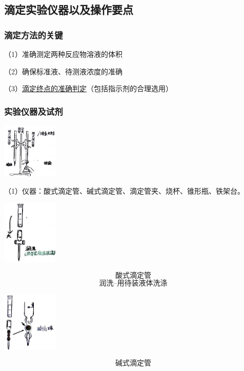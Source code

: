 \documentclass[10pt,cn]{elegantbook}
\begin{document}
	\subsection{滴定实验仪器以及操作要点}
	
	\subsubsection{滴定方法的关键}
	
	（1）准确测定两种反应物溶液的体积
	
	（2）确保标准液、待测液浓度的准确
	
	（3）\uline{滴定终点的准确判定}（包括指示剂的合理选用）
	\subsubsection{实验仪器及试剂}
	
	\begin{center}
		\includegraphics[max width=0.2\textwidth]{image/c2-1.jpg}
	\end{center}
	
	（1）仪器：酸式滴定管、碱式滴定管、滴定管夹、烧杯、锥形瓶、铁架台。
	
	\begin{center}
		\includegraphics[max width=0.2\textwidth]{image/c2-2.jpg}
	\end{center}
	\[\mbox{酸式滴定管}\]
		\[\mbox{润洗--用待装液体洗涤}\]
	\begin{center}
		\includegraphics[max width=0.2\textwidth]{image/c2-3.jpg}
	\end{center}
		\[\mbox{碱式滴定管}\]
	 
\end{document}
